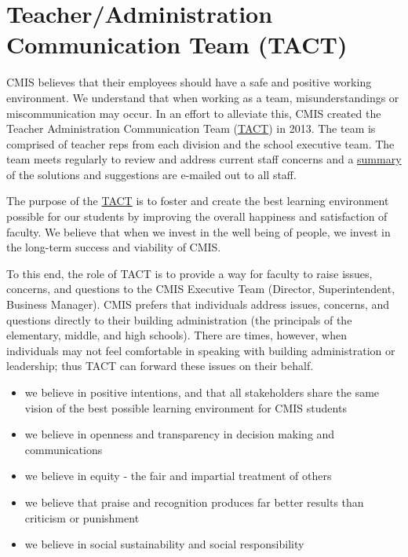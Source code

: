 \section{Teacher/Administration Communication Team (TACT)}

CMIS believes that their employees should have a safe and positive working environment. We understand that when working as a team, misunderstandings or miscommunication may occur.  In an effort to alleviate this, CMIS created the Teacher Administration Communication Team (\href{https://docs.google.com/a/cmis.ac.th/document/d/14nhwcw8xo3i-23Q-WUxo6KJ_c8yFKu-jTdCctt4MFcs/edit?usp=sharing}{TACT}) in 2013. The team is comprised of teacher reps from each division and the school executive team. The team meets regularly to review and address current staff concerns and a \href{https://docs.google.com/a/cmis.ac.th/document/d/1KLB4c5_LkxXzq4vP2EuNhBVPp2q_FT9qy1cBBwaS5JM/edit?usp=sharing}{summary} of the solutions and suggestions are e-mailed out to all staff.

The purpose of the \href{https://docs.google.com/document/d/12ZwL4geAPTDcm-SI6U1fRpXEKxKZ-61q54upcikt6lc/edit}{TACT} is to foster and create the best learning environment possible for our students by improving the overall happiness and satisfaction of faculty. We believe that when we invest in the well being of people, we invest in the long-term success and viability of CMIS.

To this end, the role of TACT is to provide a way for faculty to raise issues, concerns, and questions to the CMIS Executive Team (Director, Superintendent, Business Manager).  CMIS prefers that individuals address issues, concerns, and questions directly to their building administration (the principals of the elementary, middle, and high schools).  There are times, however, when individuals may not feel comfortable in speaking with building administration or leadership; thus TACT can forward these issues on their behalf.

\begin{itemize}
\item we believe in positive intentions, and that all stakeholders share the same vision of the best possible learning environment for CMIS students
\item we believe in openness and transparency in decision making and communications
\item we believe in equity - the fair and impartial treatment of others
\item we believe that praise and recognition produces far better results than criticism or punishment
\item we believe in social sustainability and social responsibility
\end{itemize}

